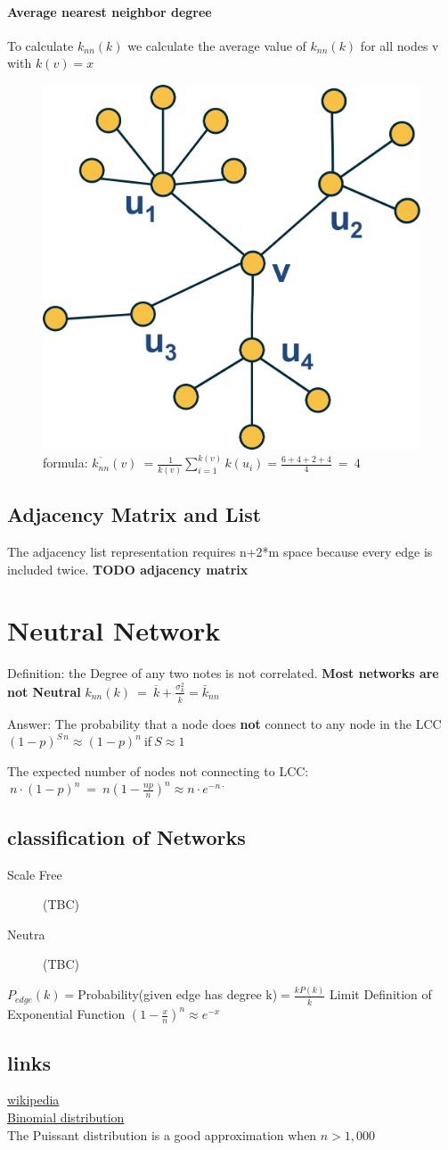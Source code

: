 \documentclass[../main.tex]{subfiles}
\begin{document}
\paragraph{Average nearest neighbor degree }
To calculate $k_{nn}(k)$ we calculate the average value of $k_{nn}(k)$ for all nodes v with $k(v)=x$

\begin{figure}
    \centering
    \includegraphics[width=0.5\linewidth]{k-neighbor-example.png}
    \caption{formula: $\overline{k_{nn}}(v)\:=\frac{\:1}{k(v)}\sum\limits_{i=1}^{k(v)}k(u_i)=\frac{6+4+2+4}{4}\:=\:4$}
\end{figure}

\subsection{Adjacency Matrix and List}
The adjacency list representation requires n+2*m space because every edge is included twice. 
\textbf{TODO adjacency matrix}

\section{Neutral Network}
Definition: the Degree of any two notes is not correlated.
\textbf{Most networks are not Neutral}
$k_{nn}(k)\:=\:\overline{k}+\frac{\sigma_k^2}{\overline{k}}=\bar{k}_{nn}$


Answer: The probability that a node does \textbf{not} connect to any node in the LCC $(1-p)^{S \, n}\approx(1-p)^n\:$if$\:S\approx1$

The expected number of nodes not connecting to LCC:
$\:n\cdot(1-p)^n\:=\:n(1-\frac{np}{n})^n\approx n\cdot e^{-n\cdotp}$

\subsection{classification of Networks}
\begin{description}
    \item[Scale Free] (TBC)
    \item[Neutra] (TBC)
\end{description}
$P_{edge}(k)= $Probability(given edge has degree k)$=\frac{kP(k)}{\overline{k}}$
Limit Definition of Exponential Function $(1-\frac{x}{n})^n\approx e^{-x}$
\subsection{links}
\href{https://en.wikipedia.org/wiki/Erd%C5%91s%E2%80%93R%C3%A9nyi_model}{wikipedia}\\
\href{https://en.wikipedia.org/wiki/Binomial_distribution}{Binomial distribution}\\
The Puissant distribution is a good approximation when $n>1,000$
\end{document}
